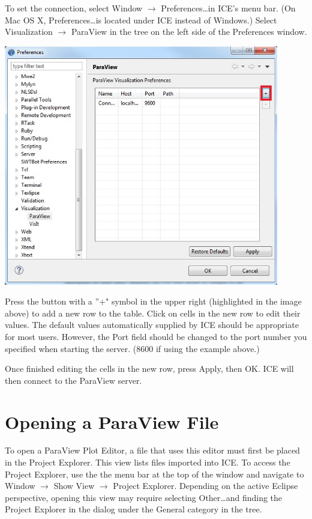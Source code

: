 To set the connection, select Window $\rightarrow$ Preferences\ldots in ICE's
menu bar. (On Mac OS X, Preferences\ldots is located under ICE instead of
Windows.) Select Visualization $\rightarrow$ ParaView in the tree on the left
side of the Preferences window.

\begin{center}
\includegraphics[width=12cm]{images/paraviewpreferencepage_ice}
\end{center}

Press the button with a ''+" symbol in the upper right (highlighted in the image
above) to add a new row to the table. Click on cells in the new row to edit
their values. The default values automatically supplied by ICE should be
appropriate for most users. However, the Port field should be changed to the
port number you specified when starting the server. (8600 if using the example
above.)

Once finished editing the cells in the new row, press Apply, then OK. ICE will
then connect to the ParaView server.

\section{Opening a ParaView File} 

To open a ParaView Plot Editor, a file that uses this editor must first be
placed in the Project Explorer. This view lists files imported into ICE. To
access the Project Explorer, use the the menu bar at the top of the window and
navigate to Window $\rightarrow$ Show View $\rightarrow$ Project Explorer.
Depending on the active Eclipse perspective, opening this view may require
selecting Other\ldots and finding the Project Explorer in the dialog under the
General category in the tree.

